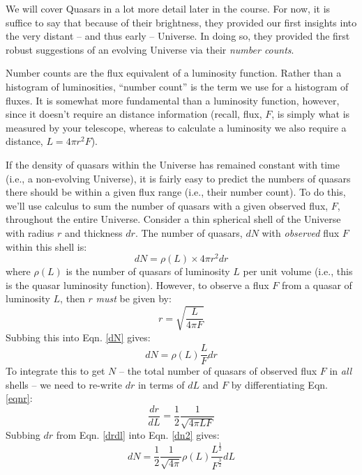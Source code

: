 \documentclass[11pt]{article}
\begin{document}
We will cover Quasars in a lot more detail later in the course. For
now, it is suffice to say that because of their brightness, they
provided our first insights into the very distant -- and thus early --
Universe. In doing so, they provided the first robust suggestions of
an evolving Universe via their {\it number counts}.

Number counts are the flux equivalent of a luminosity function. Rather
than a histogram of luminosities, ``number count'' is the term we use
for a histogram of fluxes. It is somewhat more fundamental than a
luminosity function, however, since it doesn't require an distance
information (recall, flux, $F$, is simply what is measured by your
telescope, whereas to calculate a luminosity we also require a
distance, $L=4\pi r^2F$).

If the density of quasars within the Universe has remained constant
with time (i.e., a non-evolving Universe), it is fairly easy to
predict the numbers of quasars there should be within a given flux
range (i.e., their number count). To do this, we'll use calculus to
sum the number of quasars with a given observed flux, $F$, throughout
the entire Universe. Consider a thin spherical shell of the Universe
with radius $r$ and thickness $dr$. The number of quasars, $dN$ with
{\it observed} flux $F$ within this shell is:
\begin{equation}
\label{dN}
dN = \rho(L)\times4\pi r^2 dr
\end{equation} 
where $\rho(L)$ is the number of quasars of luminosity $L$ per unit
volume (i.e., this is the quasar luminosity function). However, to observe a
flux $F$ from a quasar of luminosity $L$, then $r$ {\it must} be given
by:
\begin{equation}
\label{eqnr}
r = \sqrt{\frac{L}{4\pi F}}
\end{equation} 
Subbing this into Eqn. \ref{dN} gives:
\begin{equation}
\label{dn2}
dN = \rho(L) \frac{L}{F} dr
\end{equation} 
To integrate this to get $N$ -- the total number of quasars of observed
flux $F$ in {\it all} shells -- we need to re-write $dr$ in terms of
$dL$ and $F$ by differentiating Eqn. \ref{eqnr}:
\begin{equation}
\label{drdl}
\frac{dr}{dL} = \frac{1}{2}\frac{1}{\sqrt{4\pi LF}}
\end{equation} 
Subbing $dr$ from Eqn. \ref{drdl} into Eqn. \ref{dn2} gives:
\begin{equation}
dN = \frac{1}{2}\frac{1}{\sqrt{4\pi}}\rho(L)\frac{L^{\frac{1}{2}}}{F^{\frac{3}{2}}}dL
\end{equation} 
\end{document}
